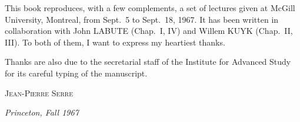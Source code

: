 
This book reproduces, with a few complements, a set of lectures given at
McGill University, Montreal, from Sept.~5 to Sept.~18, 1967. It has been
written in collaboration with John LABUTE (Chap.~I, IV) and Willem KUYK
(Chap.~II, III). To both of them, I want to express my heartiest thanks.

Thanks are also due to the secretarial staff of the Institute for Advanced
Study for its careful typing of the manuscript.

\medskip
\hfill \textsc{Jean-Pierre Serre}

\medskip
\hfill \textit{Princeton, Fall 1967}
